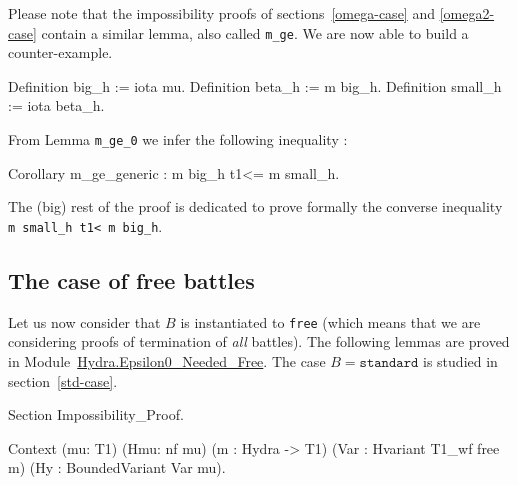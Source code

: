 Please note that the impossibility proofs of 
sections~\vref{omega-case} and \vref{omega2-case} contain a similar lemma, also called \texttt{m\_ge}.
We are now able to build a counter-example.

\begin{Coqsrc}
  Definition big_h := iota mu.
  Definition beta_h := m big_h.
  Definition small_h := iota beta_h.
\end{Coqsrc}
  
From Lemma \texttt{m\_ge\_0} we infer the following inequality :

\begin{Coqsrc}
    Corollary m_ge_generic : m big_h t1<= m small_h.
 \end{Coqsrc}

The (big) rest of the proof is dedicated to prove formally the converse inequality 
\texttt{m small\_h t1< m big\_h}. 



\subsection{The case of free battles}
\label{sec:free-battles-case}
Let us now consider that $B$ is instantiated to \texttt{free} (which means that we are considering proofs of termination of \emph{all} battles). The following lemmas are proved in Module~\href{../theories/html/hydras.Hydra.Epsilon0_Needed_Free.html}{Hydra.Epsilon0\_Needed\_Free}.
The case $B=\texttt{standard}$ is studied in section~\vref{std-case}.



\begin{Coqsrc}
Section Impossibility_Proof.

  Context (mu: T1)
          (Hmu: nf mu)
          (m : Hydra -> T1)
          (Var : Hvariant  T1_wf free m)
          (Hy : BoundedVariant Var mu).
  \end{Coqsrc}


